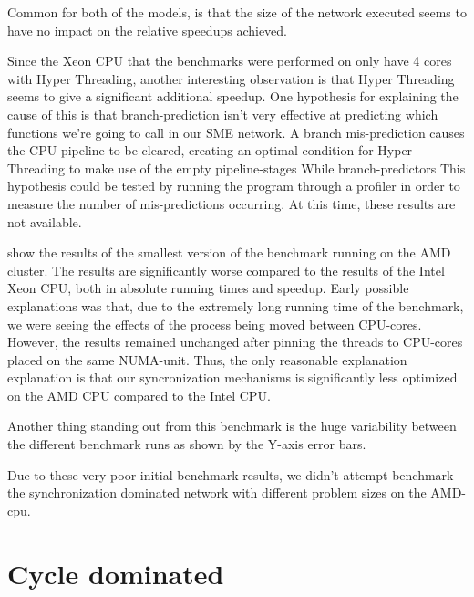 
Common for both of the models, is that the size of the network
executed seems to have no impact on the relative speedups achieved.

Since the Xeon CPU that the benchmarks were performed on only have 4
cores with Hyper Threading, another interesting observation is that
Hyper Threading seems to give a significant additional speedup. One
hypothesis for explaining the cause of this is that branch-prediction
isn't very effective at predicting which functions we're going to call
in our SME network. A branch mis-prediction causes the CPU-pipeline to
be cleared, creating an optimal condition for Hyper Threading to make
use of the empty pipeline-stages\cite{fog2014microarchitecture} While
branch-predictors This hypothesis could be tested by running the
program through a profiler in order to measure the number of
mis-predictions occurring. At this time, these results are not
available.

 show the results of the smallest version of the
benchmark running on the AMD cluster. The results are significantly
worse compared to the results of the Intel Xeon CPU, both in absolute
running times  and
speedup. Early possible explanations was that, due to the extremely
long running time of the benchmark, we were seeing the effects of the
process being moved between CPU-cores. However, the results remained
unchanged after pinning the threads to CPU-cores placed on the same
NUMA-unit. Thus, the only reasonable explanation explanation is that our
syncronization mechanisms is significantly less optimized on the AMD
CPU compared to the Intel CPU.

Another thing standing out from this benchmark is the huge variability
between the different benchmark runs as shown by the Y-axis error bars.

Due to these very poor initial benchmark results, we didn't attempt
benchmark the synchronization dominated network with different problem
sizes on the AMD-cpu.


\section{Cycle dominated}

